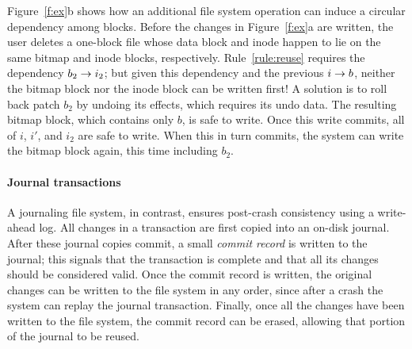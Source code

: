 \begin{comment}
\begin{figure}[htb]
  \centering
  \texttt{[image: fig/examplesb\_3]}
  \caption{\label{fig:softupdate} Soft updates \patches\
  for appending one block to an empty file in an FFS-like file system.}
\end{figure}
\end{comment}

Figure~\ref{f:ex}b shows how an additional file system operation can induce
 a circular dependency among blocks.
%
Before the changes in Figure~\ref{f:ex}a are written, the user deletes a
 one-block file whose data block and inode happen to lie on the same bitmap
 and inode blocks, respectively.
%
Rule~\ref{rule:reuse} requires the dependency $b_2 \rightarrow i_2$; but
 given this dependency and the previous $i \rightarrow b$, neither the bitmap
 block nor the inode block can be written first!
%
A solution is to roll back patch $b_2$ by undoing its effects, which
 requires its undo data.  The resulting bitmap block, which contains only
 $b$, is safe to write.  Once this write commits, all of $i$, $i'$, and
 $i_2$ are safe to write.  When this in turn commits, the system can write
 the bitmap block again, this time including $b_2$.


\paragraph{Journal transactions}
%
A journaling file system, in contrast, ensures post-crash consistency using
 a write-ahead log.
%
%
All changes in a transaction are first copied into an on-disk journal.
%
After these journal copies commit, a small \emph{commit record} is written
 to the journal; this signals that the transaction is complete and that all
 its changes should be considered valid.
%
Once the commit record is written, the original changes can be written to the
file system in any order, since after a crash the system can replay the
 journal transaction.
%
Finally, once all the changes have been written to the file system, the commit
record can be erased, allowing that portion of the journal to be reused.

\begin{comment}
\begin{figure}[htb]
  \centering
  \texttt{[image: fig/examplesb\_2]}
  \caption{\label{fig:journal} An example journal transaction using \patches.}
\end{figure}
\end{comment}

